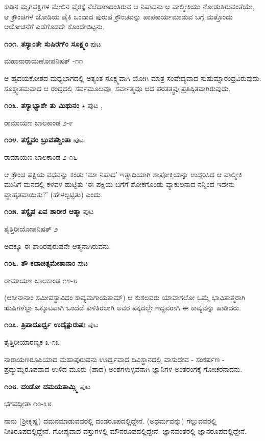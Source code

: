 ಕಾಡಿನ ಮೃಗಪಕ್ಷಿಗಳ ಮೇಲಿನ ವೈರಕ್ಕೆ ನೆಲೆದಾಣದಂತಿರುವ ಆ ನಿಷಾದನು ಆ ವಾಲ್ಮೀಕಿಯು ನೋಡುತ್ತಿರುವಂತೆಯೇ, ಆ ಕ್ರೌಂಚಗಳ ಜೋಡಿಯ ಪೈಕಿ ಒಂದಾದ ಪುರುಷ ಕ್ರೌಂಚವನ್ನು ಪಾಪಕಾರ್ಯಮಾಡುವ ಬಗ್ಗೆ ಮತ್ತೊಂದು ಆಲೋಚನೆಗೆ ಎಡೆಗೊಡದೇ ಕೊಂದೇಬಿಟ್ಟನು.

\medskip
\noindent\textbf{೧೦೧. ತಸ್ಯಾಂತೇ ಸುಷಿರಗ್ಂ ಸೂಕ್ಷ್ಮಂ} \hfill ಪುಟ \pageref{27}

\hfill ಮಹಾನಾರಾಯಣೋಪನಿಷತ್ -೧೧

ಆ ಹೃದಯಕೋಶದ ಮಧ್ಯಭಾಗದಲ್ಲಿ ಅತ್ಯಂತ ಸೂಕ್ಷ್ಮವಾಗಿ ಯೋಗಿ ಮಾತ್ರ ಸಂವೇದ್ಯವಾದ ಸುಷುಮ್ನಾರಂಧ್ರವಿರುವುದು. ಸೂಕ್ಷ್ಮಾತಮವಾದ ಆ ರಂಧ್ರದಲ್ಲಿ ಸರ್ವಮೂಲವೂ, ಸರ್ವಾತ್ಮವೂ ಆದ ಪರತತ್ತ್ವವು ಪ್ರತಿಷ್ಠಿತವಾಗಿರುವುದು.

\medskip
\noindent\textbf{೧೦೩. ತಸ್ಯಾಭ್ಯಾಶೇ ತು ಮಿಥುನಂ} $\star$ \hfill ಪುಟ \pageref{156a},\label{198a}

\hfill ರಾಮಾಯಣ ಬಾಲಕಾಂಡ ೨-೯

\medskip
\noindent\textbf{೧೦೪. ತಸ್ಯೈವಂ ಬ್ರುವತಶ್ಚಿಂತಾ} \hfill ಪುಟ \pageref{201}

\hfill ರಾಮಾಯಣ ಬಾಲಕಾಂಡ ೨-೧೬

ಆ ಕ್ರೌಂಚ ಪಕ್ಷಿಯ ವಧವನ್ನು ಕಂಡು `ಮಾ ನಿಷಾದ' ಇತ್ಯಾದಿಯಾಗಿ ಶಾಪೋಕ್ತಿಯನ್ನು ಉದ್ಗರಿಸಿದ ಆ ವಾಲ್ಮೀಕಿ ಮುನಿಗೆ ಮನದಲ್ಲಿ ಕಳವಳ ಹುಟ್ಟಿತು `ಈ ಪಕ್ಷಿಯ ಬಗೆಗೆ ಶೋಕಗೊಂಡು ವ್ಯಾಕುಲನಾದ ನನ್ನಿಂದ ಇದೇನು ವ್ಯಾಹೃತವಾಯಿತು?' (ಹೇಳಲ್ಪಟ್ಟಿತು) ಎಂದು.

\medskip
\noindent\textbf{೧೦೫. ತಸ್ಯೈಷ ಏವ ಶಾರೀರ ಆತ್ಮಾ} \hfill ಪುಟ \pageref{76a}

\hfill ತೈತ್ತಿರೀಯೋಪನಿಷತ್ ೨

ಅದಕ್ಕೂ ಈ ಶಾರಿರಪುರುಷನೇ ಆತ್ಮನಾಗಿರುವನು.

\medskip
\noindent\textbf{೧೦೬. ತೌ ಕದಾಚಿತ್ಸಮೇತಾನಾಂ} \hfill ಪುಟ \pageref{189}

\hfill ರಾಮಾಯಣ ಬಾಲಕಾಂಡ ೧೪-೮

(ಆಸೀನಾನಾಂ ಸಮೀಪಸ್ಥಾವಿದಂ ಕಾವ್ಯಮಗಾಯತಾಮ್) ಆ ಕುಶಲವರು ಯಾವಾಗಲೋ ಒಮ್ಮೆ ಭಾವಿತಾತ್ಮರಾಗಿ ಋಷಿಗಳೆಲ್ಲಾ ಒಕ್ಕೂಟವಾಗಿ ಒಂದೆಡೆ ಕುಳಿತಿರಲಾಗಿ ಅವರ ಪಕ್ಕದಲ್ಲೇ ಇದ್ದವರಾಗಿ ಈ ಕಾವ್ಯವನ್ನು ಹಾಡಿದರು.

\medskip
\noindent\textbf{೧೦೭. ತ್ರಿಪಾದೂರ್ಧ್ವ ಉದೈತ್ಪುರುಷಃ} \hfill ಪುಟ \pageref{252a}

\hfill ತೈತ್ತಿರೀಯಾರಣ್ಯಕ ೩-೧೩

ನಾರಾಯಣರೂಪಿಯಾದ ಮಹಾಪುರುಷನು ಊರ್ಧ್ವವಾದ ದಿವಿಸ್ಥಾನದಲ್ಲಿ ವಾಸುದೇವ - ಸಂಕರ್ಷಣ - ಪ್ರದ್ಯುಮ್ನರೂಪವಾದ ಉಳಿದ ಮೂರು (ಪಾದ) ಅಂಶಗಳುಳ್ಳವನಾಗಿ ಜ್ಞಾನಿಗಳ ಅಂತರಂಗಕ್ಕೆ ಗೋಚರನಾದನು. 

\medskip
\noindent\textbf{೧೦೮. ದಂಡೋ ದಮಯತಾಮ್ಸ್ಮಿ} \hfill ಪುಟ \pageref{93}

\hfill ಭಗವದ್ಗೀತಾ ೧೦-೩೮

ನಾನು (ಶ್ರೀಕೃಷ್ಣ) ದಮನಮಾಡುವವರಲ್ಲಿ ದಂಡರೂಪದಲ್ಲಿದ್ದೇನೆ. (ಅಧರ್ಮವನ್ನು) ಗೆಲ್ಲುವವರಲ್ಲಿ ನೀತಿರೂಪದಲ್ಲಿದ್ದೇನೆ. ಗೋಪ್ಯವಾದ ವಸ್ತುಗಳಲ್ಲಿ ಮೌನರೂಪದಲ್ಲಿದ್ದೇನೆ. ಜ್ಞಾನವಂತರಲ್ಲಿ ಜ್ಞಾನರೂಪದಲ್ಲಿದ್ದೇನೆ.

